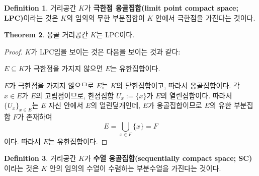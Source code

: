 \documentclass[11pt]{book}
\numberwithin{equation}{chapter}
\theoremstyle{definition}
\newtheorem{thm}{Theorem}[section]
\newtheorem{defn}[thm]{Definition}
\begin{document}
\begin{defn}
    거리공간 \(K\)가 \textbf{극한점 옹골집합(limit point compact space; LPC)}이라는 것은 \(K\)의 임의의 무한 부분집합이 \(K\) 안에서 극한점을 가진다는 것이다.
\end{defn}

\begin{thm} \label{thm 6.2.2}
    옹골 거리공간 \(K\)는 LPC이다.
\end{thm}
\begin{proof}
    \(K\)가 LPC임을 보이는 것은 다음을 보이는 것과 같다:
    \begin{center}
        \(E \subseteq K\)가 극한점을 가지지 않으면 \(E\)는 유한집합이다.
    \end{center}
    \(E\)가 극한점을 가지지 않으므로 \(E\)는 \(K\)의 닫힌집합이고, 따라서 옹골집합이다. 각 \(x \in E\)가 \(E\)의 고립점이므로, 한점집합 \(U_x := \{x\}\)가 \(E\)의 열린집합이다. 따라서 \(\{U_x\}_{x \in E}\)는 \(E\) 자신 안에서 \(E\)의 열린덮개인데, \(E\)가 옹골집합이므로 \(E\)의 유한 부분집합 \(F\)가 존재하여
    \[
    E = \bigcup_{x \in F} \{x\} = F    
    \]
    이다. 따라서 \(E\)는 유한집합이다.
\end{proof}

\begin{defn}
    거리공간 \(K\)가 \textbf{수열 옹골집합(sequentially compact space; SC)}이라는 것은 \(K\) 안의 임의의 수열이 수렴하는 부분수열을 가진다는 것이다.
\end{defn}
\end{document}
